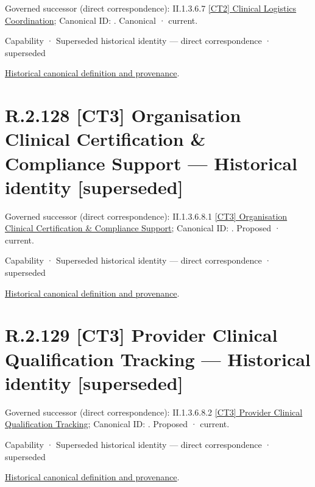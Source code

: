 {\small Governed successor (direct correspondence): II.1.3.6.7 \hyperref[element:0c27be11b4a44cb19e992309b8146a17]{[CT2] Clinical Logistics Coordination}; Canonical ID: \texttt{}. Canonical · current.}\par
\label{element:90a782ff2d004fa984ae0465528b2253}
{\small Capability · Superseded historical identity — direct correspondence · superseded}\par
\href{../../../../continuum/strategy/capability/90a782ff2d004fa984ae0465528b2253.md}{Historical canonical definition and provenance}.\par
\section*{R.2.128 [CT3] Organisation Clinical Certification \& Compliance Support — Historical identity [superseded]}
\label{navigation:R.2.128}

{\small Governed successor (direct correspondence): II.1.3.6.8.1 \hyperref[element:4de624e7bf49472f91e3e5c734ee8725]{[CT3] Organisation Clinical Certification \& Compliance Support}; Canonical ID: \texttt{}. Proposed · current.}\par
\label{element:cee76a930a4e4e7d9c49357ba290c8bf}
{\small Capability · Superseded historical identity — direct correspondence · superseded}\par
\href{../../../../continuum/strategy/capability/cee76a930a4e4e7d9c49357ba290c8bf.md}{Historical canonical definition and provenance}.\par
\section*{R.2.129 [CT3] Provider Clinical Qualification Tracking — Historical identity [superseded]}
\label{navigation:R.2.129}

{\small Governed successor (direct correspondence): II.1.3.6.8.2 \hyperref[element:8fd5c78eba3046fa9153fb4efb44e9c8]{[CT3] Provider Clinical Qualification Tracking}; Canonical ID: \texttt{}. Proposed · current.}\par
\label{element:ab0415e2ea0a4da4ad3dc46997d48bc3}
{\small Capability · Superseded historical identity — direct correspondence · superseded}\par
\href{../../../../continuum/strategy/capability/ab0415e2ea0a4da4ad3dc46997d48bc3.md}{Historical canonical definition and provenance}.\par
